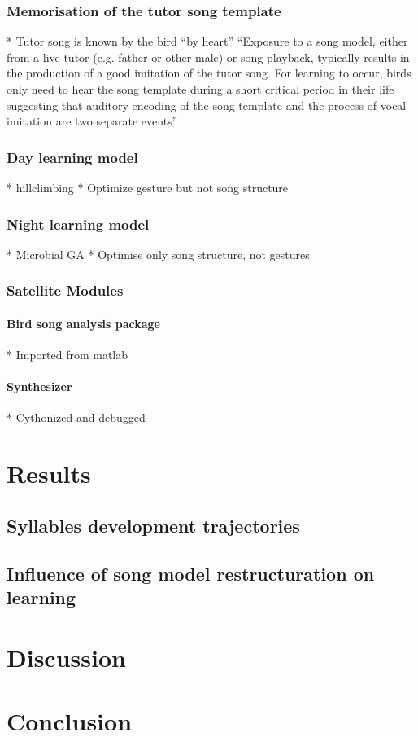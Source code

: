 \documentclass{report}
\begin{document}
\subsection{Memorisation of the tutor song template}

* Tutor song is known by the bird ``by heart'' \cite{deregnaucourt_how_2005, margoliash_sleep_2010}
``Exposure to a song model, either from a live tutor (e.g. father or other
male) or song playback, typically results in the production of a good imitation
of the tutor song. For learning to occur, birds only need to hear the song
template during a short critical period in their life suggesting that auditory
encoding of the song template and the process of vocal imitation are two
separate events'' 

\subsection{Day learning model}

* hillclimbing
* Optimize gesture but not song structure


\subsection{Night learning model}

* Microbial GA
* Optimise only song structure, not gestures

\subsection{Satellite Modules}

\subsubsection{Bird song analysis package}

* Imported from matlab

\subsubsection{Synthesizer}

* Cythonized and debugged

\chapter{Results}

\section{Syllables development trajectories}

\section{Influence of song model restructuration on learning}

\chapter{Discussion}

\chapter{Conclusion}

\printbibliography{}
\end{document}
